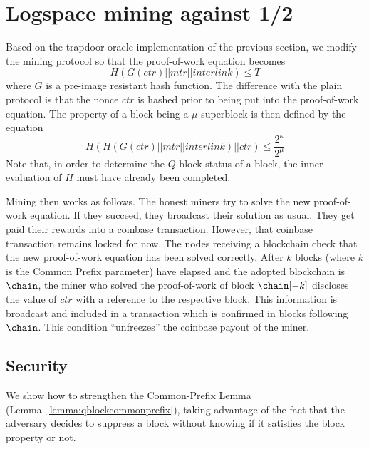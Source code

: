 \section{Logspace mining against 1/2}\label{sec.mining12}%


Based on the trapdoor oracle implementation of the previous section,
we modify the mining protocol so that the proof-of-work equation becomes
\[H(G(ctr) || mtr || interlink) \leq T\]
where $G$ is a pre-image resistant hash
function. The difference with the plain protocol is that the nonce $ctr$ is
hashed prior to being put into the proof-of-work equation. The property of a
block being a $\mu$-superblock is then defined by the equation
\[H(H(G(ctr) || mtr || interlink) || ctr) \leq \frac{2^\kappa}{2^\mu}\]
Note
that, in order to determine the $Q$-block status of a block, the inner
evaluation of $H$ must have already been completed.

Mining then works as follows. The honest miners try to solve the new
proof-of-work equation. If they succeed, they broadcast their solution as usual.
They get paid their rewards into a coinbase transaction. However, that coinbase
transaction remains locked for now. The nodes receiving a blockchain check that
the new proof-of-work equation has been solved correctly. After $k$ blocks
(where $k$ is the Common Prefix parameter) have elapsed and the adopted
blockchain is $\chain$, the miner who solved the proof-of-work of block
$\chain[-k]$ discloses the value of $ctr$ with a reference to the respective
block. This information is broadcast and included in a transaction which is
confirmed in blocks following $\chain$. This condition ``unfreezes'' the
coinbase payout of the miner.


\subsection{Security}%

We show how to strengthen the Common-Prefix Lemma
(Lemma~\ref{lemma:qblockcommonprefix}), taking advantage of the fact
that the adversary decides to suppress a block without knowing if it
satisfies the block property or not.

